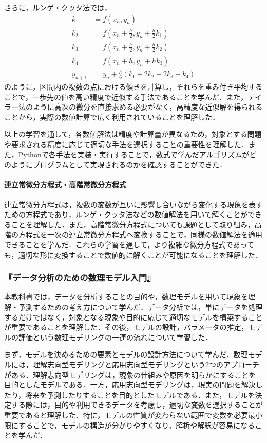 さらに，ルンゲ・クッタ法では，
\begin{align}
    k_1 &= f(x_n, y_n) \\
    k_2 &= f\left(x_n + \frac{h}{2}, y_n + \frac{h}{2} k_1\right) \\
    k_3 &= f\left(x_n + \frac{h}{2}, y_n + \frac{h}{2} k_2\right) \\
    k_4 &= f(x_n + h, y_n + h k_3) \\
    y_{n+1} &= y_n + \frac{h}{6} (k_1 + 2k_2 + 2k_3 + k_4)
\end{align}
のように，区間内の複数の点における傾きを計算し，それらを重み付き平均することで，一歩先の値を高い精度で近似する手法であることを学んだ．また，テイラー法のように高次の微分を直接求める必要がなく，高精度な近似解を得られることから，実際の数値計算で広く利用されていることを理解した．

以上の学習を通して，各数値解法は精度や計算量が異なるため，対象とする問題や要求される精度に応じて適切な手法を選択することの重要性を理解した．また，Pythonで各手法を実装・実行することで，数式で学んだアルゴリズムがどのようにプログラムとして実現されるのかを確認することができた．

\paragraph{連立常微分方程式・高階常微分方程式}
連立常微分方程式は，複数の変数が互いに影響し合いながら変化する現象を表すための方程式であり，ルンゲ・クッタ法などの数値解法を用いて解くことができることを理解した．また，高階常微分方程式についても課題として取り組み，高階の方程式を一次の連立常微分方程式へ変換することで，同様の数値解法を適用できることを学んだ．これらの学習を通して，より複雑な微分方程式であっても，適切な形に変換することで数値的に解くことが可能になることを理解した．

\subsubsection{『データ分析のための数理モデル入門』}
本教科書では，データを分析することの目的や，数理モデルを用いて現象を理解・予測するための考え方について学んだ．データ分析では，単にデータを処理するだけではなく，対象となる現象や目的に応じて適切なモデルを構築することが重要であることを理解した．その後，モデルの設計，パラメータの推定，モデルの評価という数理モデリングの一連の流れについて学習した．

まず，モデルを決めるための要素とモデルの設計方法について学んだ．数理モデルには，理解志向型モデリングと応用志向型モデリングという2つのアプローチがある．理解志向型モデリングは，現象の仕組みや原因を明らかにすることを目的としたモデルである．一方，応用志向型モデリングは，現実の問題を解決したり，将来を予測したりすることを目的としたモデルである．また，モデルを決定する際には，目的や利用できるデータを考慮し，適切な変数を選択することが重要であると理解した．特に，モデルの性質が変わらない範囲で変数を必要最小限にすることで，モデルの構造が分かりやすくなり，解析や解釈が容易になることを学んだ．

